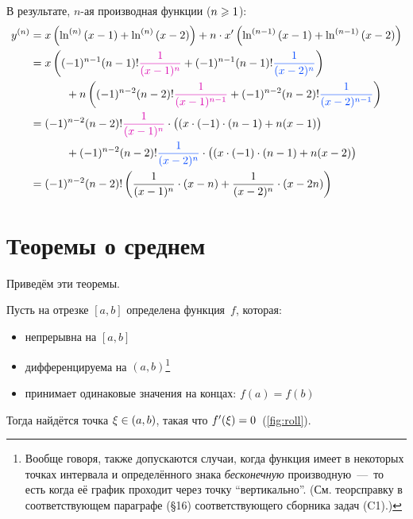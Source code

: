 \documentclass[a4paper,12pt]{article}
\begin{document}
\begin{solution}
    В результате, $n$-ая производная функции ($n \hm\geq 1$):
    \begin{equation*}
    \begin{split}
      y^{(n)} &= x \left(\ln^{(n)}{(x - 1)} + \ln^{(n)}{(x - 2)}\right)
          + n \cdot x' \left(\ln^{(n - 1)}{(x - 1)} + \ln^{(n - 1)}{(x - 2)}\right)\\
        &= x \left(
            (-1)^{n - 1} (n - 1)! \textcolor{pink}{\frac{1}{(x - 1)^n}} + (-1)^{n - 1} (n - 1)! \textcolor{blue}{\frac{1}{(x - 2)^n}}
          \right)\\
        &\hphantom{MMM} + n \left(
            (-1)^{n - 2} (n - 2)! \textcolor{pink}{\frac{1}{(x - 1)^{n - 1}}} + (-1)^{n - 2} (n - 2)! \textcolor{blue}{\frac{1}{(x - 2)^{n - 1}}}
          \right)\\
        &= (-1)^{n - 2} (n - 2)! \textcolor{pink}{\frac{1}{(x - 1)^{n}}} \cdot \bigl((x \cdot (-1) \cdot (n - 1) + n(x - 1)\bigr)\\
        &\hphantom{MMM} + (-1)^{n - 2} (n - 2)! \textcolor{blue}{\frac{1}{(x - 2)^{n}}} \cdot \bigl((x \cdot (-1) \cdot (n - 1) + n(x - 2)\bigr)\\
        &= (-1)^{n - 2} (n - 2)! \left(
          \frac{1}{(x - 1)^{n}} \cdot (x - n) + \frac{1}{(x - 2)^{n}} \cdot (x - 2n)
          \right)
    \end{split}
    \end{equation*}
  \end{solution}


  \section{Теоремы о среднем}


  Приведём эти теоремы.

  \begin{theorem}\label{theo:roll}
    Пусть на отрезке $[a, b]$ определена функция~$f$, которая:
    \begin{itemize}
      \item непрерывна на $[a, b]$
      \item дифференцируема на $(a, b)$\footnote{
        Вообще говоря, также допускаются случаи, когда функция имеет в некоторых точках интервала и определённого знака \emph{бесконечную} производную~---~то есть когда её график проходит через точку ``вертикально''.
        (См. теорсправку в соответствующем параграфе (\S 16) соответствующего сборника задач (C1).)
      }
      \item принимает одинаковые значения на концах: $f(a) = f(b)$
    \end{itemize}

    Тогда найдётся точка $\xi \hm\in (a, b)$, такая что $f'(\xi) \hm= 0$~(\ref{fig:roll}).
  \end{theorem}
\end{document}
